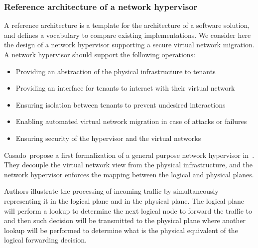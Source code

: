 \subsubsection{Reference architecture of a network hypervisor}
\label{sec:reference_archi}
A reference architecture is a template for the architecture of a software solution, and defines a vocabulary to compare existing implementations. 
We consider here the design of a network hypervisor supporting a secure virtual network migration.
A network hypervisor should support the following operations:
\begin{itemize}
    \item Providing an abstraction of the physical infrastructure to tenants
    \item Providing an interface for tenants to interact with their virtual network
    \item Ensuring isolation between tenants to prevent undesired interactions 
    \item Enabling automated virtual network migration in case of attacks or failures
    \item Ensuring security of the hypervisor and the virtual networks
\end{itemize}

Casado~\etal propose a first formalization of a general purpose network hypervisor in~\cite{Netvirt_Definition-Casado2010}. They decouple the virtual network view from the physical infrastructure, and the network hypervisor enforces the mapping between the logical and physical planes.

Authors illustrate the processing of incoming traffic by simultaneously representing it in the logical plane and in the physical plane.
The logical plane will perform a lookup to determine the next logical node to forward the traffic to and then such decision will be transmitted to the physical plane where another lookup will be performed to determine what is the physical equivalent of the logical forwarding decision.


